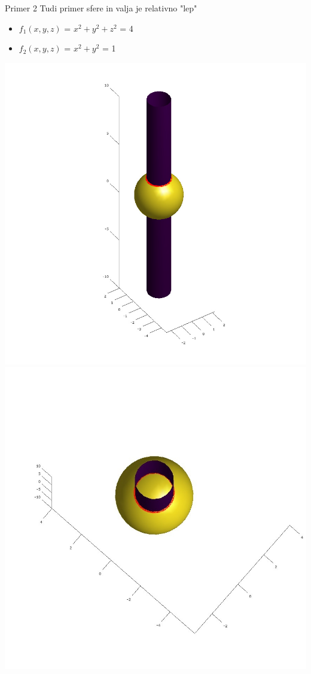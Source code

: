 \documentclass{beamer}
\begin{document}
\begin{frame}{Primer 2}
	Tudi primer sfere in valja je relativno "lep"\\
	
	\begin{itemize}  
		\item $f_{1}(x,y,z)$ = $x^2 + y^2 + z^2$ = 4
		\item $f_{2}(x,y,z)$ = $x^2 + y^2$ = 1
	\end{itemize} 
	\includegraphics[scale=0.3]{primer2_1}
	\includegraphics[scale=0.3]{primer2_2}
\end{frame}
\end{document}
